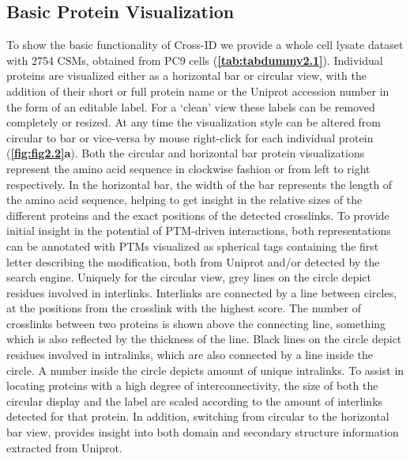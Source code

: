 \subsection{Basic Protein Visualization}
To show the basic functionality of Cross-ID we provide a whole cell lysate dataset with 2754 CSMs, obtained from PC9 cells (\textbf{\autoref{tab:tabdummy2.1}}). Individual proteins are visualized either as a horizontal bar or circular view, with the addition of their short or full protein name or the Uniprot accession number in the form of an editable label. For a ‘clean’ view these labels can be removed completely or resized. At any time the visualization style can be altered from circular to bar or vice-versa by mouse right-click for each individual protein (\textbf{\autoref{fig:fig2.2}a}). Both the circular and horizontal bar protein visualizations represent the amino acid sequence in clockwise fashion or from left to right respectively. In the horizontal bar, the width of the bar represents the length of the amino acid sequence, helping to get insight in the relative sizes of the different proteins and the exact positions of the detected crosslinks. To provide initial insight in the potential of PTM-driven interactions, both representations can be annotated with PTMs visualized as spherical tags containing the first letter describing the modification, both from Uniprot and/or detected by the search engine. Uniquely for the circular view, grey lines on the circle depict residues involved in interlinks. Interlinks are connected by a line between circles, at the positions from the crosslink with the highest score. The number of crosslinks between two proteins is shown above the connecting line, something which is also reflected by the thickness of the line. Black lines on the circle depict residues involved in intralinks, which are also connected by a line inside the circle. A number inside the circle depicts amount of unique intralinks. To assist in locating proteins with a high degree of interconnectivity, the size of both the circular display and the label are scaled according to the amount of interlinks detected for that protein. In addition, switching from circular to the horizontal bar view, provides insight into both domain and secondary structure information extracted from Uniprot.
